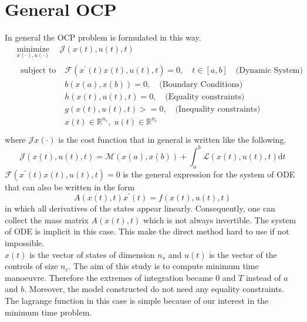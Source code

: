 \section{General OCP}
%
In general the OCP problem is formulated in this way.
%
\begin{equation}
    \begin{aligned}
    &\underset{x(\cdot), u(\cdot)}{\operatorname{minimize}} \quad \mathcal{J}(x(t), u(t), t)\\
    &\begin{aligned}
        {\text { subject to }} \;
        & \mathcal{F}(x^{\prime}(t)x(t),u(t),t)=0, \quad t \in[a, b] \quad \text{(Dynamic System)}\\
        & b(x(a),x(b))=0, \quad \text{(Boundary Conditions)}\\
        & h(x(t),u(t),t)=0, \quad \text{(Equality constraints)}\\
        & g(x(t),u(t),t)>=0, \quad \text{(Inequality constraints)}\\
        & x(t) \in \mathbb{R}^{n_s}, \; u(t) \in \mathbb{R}^{n_c}
    \end{aligned}\\
    \end{aligned}
    \label{eq:GenOCP}
\end{equation}
%
where $\mathcal{J}x(\cdot)$ is the cost function that in general is written like the following.
%
\begin{equation}
    \mathcal{J}(x(t), u(t), t)=\mathcal{M}(x(a), x(b))+\int_{a}^{b} \mathcal{L}(x(t), u(t), t) \mathrm{d} t
\end{equation}
%
$\mathcal{F}(x^{\prime}(t)x(t),u(t),t)=0$ is the general expression for the system of ODE that can also be written in the form
%
\begin{equation}
    A(x(t), t) x^{\prime}(t)=f(x(t), u(t), t)
\end{equation}
%
in which all derivatives of the states appear linearly. Consequently, one can collect the mass matrix $A(x(t), t)$ which is not always invertible. The system of ODE is implicit in this case. This make the direct method hard to use if not impossible.\\
$x(t)$ is the vector of states of dimension $n_s$ and $u(t)$ is the vector of the controls of size $n_c$.
%
The aim of this study is to compute minimum time manoeuvre. Therefore the extremes of integration became $0$ and $T$ instead of $a$ and $b$. Moreover, the model constructed do not need any equality constraints. The lagrange function in this case is simple because of our interest in the minimum time problem.
